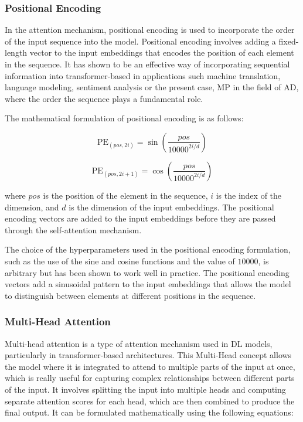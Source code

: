 \subsubsection{Positional Encoding}
\label{subsubsec:3_positional_encoding}

In the attention mechanism, positional encoding is used to incorporate the order of the input sequence into the model. Positional encoding involves adding a fixed-length vector to the input embeddings that encodes the position of each element in the sequence. It has shown to be an effective way of incorporating sequential information into transformer-based in applications such  machine translation, language modeling, sentiment analysis or the present case, \ac{MP} in the field of \ac{AD}, where the order the sequence plays a fundamental role.

The mathematical formulation of positional encoding is as follows:

\begin{equation}
	\text{PE}_{(pos,2i)} = \sin\left(\frac{pos}{10000^{2i/d}}\right)
\end{equation}

\begin{equation}
	\text{PE}_{(pos,2i+1)} = \cos\left(\frac{pos}{10000^{2i/d}}\right)
\end{equation}

where $pos$ is the position of the element in the sequence, $i$ is the index of the dimension, and $d$ is the dimension of the input embeddings. The positional encoding vectors are added to the input embeddings before they are passed through the self-attention mechanism.

The choice of the hyperparameters used in the positional encoding formulation, such as the use of the sine and cosine functions and the value of $10000$, is arbitrary but has been shown to work well in practice. The positional encoding vectors add a sinusoidal pattern to the input embeddings that allows the model to distinguish between elements at different positions in the sequence.

\subsubsection{Multi-Head Attention}
\label{subsubsec:3_multi_head_attention}

Multi-head attention is a type of attention mechanism used in \ac{DL} models, particularly in transformer-based architectures. This Multi-Head concept allows the model where it is integrated to attend to multiple parts of the input at once, which is really useful for capturing complex relationships between different parts of the input. It involves splitting the input into multiple heads and computing separate attention scores for each head, which are then combined to produce the final output. It can be formulated mathematically using the following equations:

